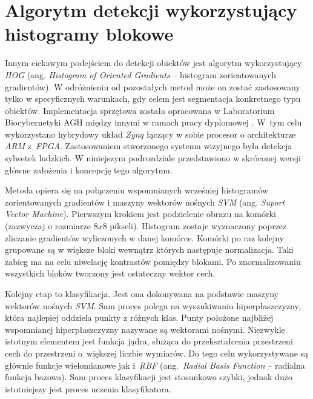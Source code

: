 
\section{Algorytm detekcji wykorzystujący histogramy blokowe}
\label{sec:hog_svn}

Innym ciekawym podejściem do detekcji obiektów jest algorytm wykorzystujący \textit{HOG} (ang. \textit{Histogram of Oriented Gradients} -- histogram zorientowanych gradientów). W odróżnieniu od pozostałych metod może on zostać zastosowany tylko w specyficznych warunkach, gdy celem jest segmentacja konkretnego typu obiektów. Implementacja sprzętowa została opracowana w Laboratorium Biocybernetyki AGH między innymi w ramach pracy dyplomowej \cite{kotarba_15}. W~tym celu wykorzystano hybrydowy układ \textit{Zynq} łączący w sobie procesor o architekturze \textit{ARM} z~\textit{FPGA}. Zastosowaniem stworzonego systemu wizyjnego była detekcja sylwetek ludzkich. W niniejszym podrozdziale przedstawiono w skróconej wersji główne założenia i koncepcję tego algorytmu.

Metoda opiera się na połączeniu wspomnianych wcześniej histogramów zorientowanych gradientów i maszyny wektorów nośnych \textit{SVM} (ang. \textit{Suport Vector Machine}). Pierwszym krokiem jest podzielenie obrazu na komórki (zazwyczaj o rozmiarze $8x8$ pikseli). Histogram zostaje wyznaczony poprzez zliczanie gradientów wyliczonych w danej komórce. Komórki po raz kolejny grupowane są w większe bloki wewnątrz których następuje normalizacja. Taki zabieg ma na celu niwelację kontrastów pomiędzy blokami. Po znormalizowaniu wszystkich bloków tworzony jest ostateczny wektor cech.

Kolejny etap to klasyfikacja. 
Jest ona dokonywana na podstawie maszyny wektorów nośnych \textit{SVM}. Sam proces polega na wyszukiwaniu hiperpłaszczyzny, która najlepiej oddziela punkty z różnych klas. Punty położone najbliżej wspomnianej hiperpłaszczyzny nazywane są wektorami nośnymi. Niezwykle istotnym elementem jest funkcja jądra, służąca do przekształcenia przestrzeni cech do przestrzeni o~większej liczbie wymiarów. Do tego celu wykorzystywane są głównie funkcje wielomianowe jak i~\textit{RBF} (ang.~\textit{Radial Basis Function} -- radialna funkcja bazowa). Sam proces klasyfikacji jest stosunkowo szybki, jednak dużo istotniejszy jest proces uczenia klasyfikatora. 

